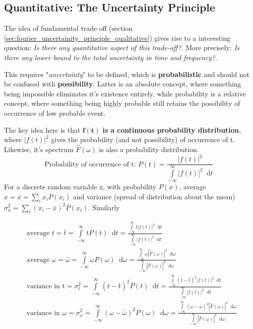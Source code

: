 \documentclass[11pt, a4paper]{article}
\newcommand{\variance}[1]{\sigma_{#1}^{2}}
\newcommand{\diff}{\mathop{}\!\mathrm{d}}
\newcommand{\dt}{\diff t}
\newcommand{\domega}{\diff \omega}
\newcommand{\dint}[2]{\int \limits_{#1}^{#2}}  %
\newcommand{\intinfty}{\dint{-\infty}{\infty}}	%
\begin{document}
\subsection{Quantitative: The Uncertainty Principle}
The idea of fundamental trade off (section \ref{sec:fourier_uncertainity_principle_qualitative}) gives rise to a interesting question: \textit{Is there any quantitative aspect of this trade-off?}. More precisely: \textit{Is there any lower bound to the total uncertainty in time and frequency?}.

This requires "\textit{uncertainty}" to be defined, which is \textbf{probabilistic} and should not be confused with \textbf{possibility}. Latter is an absolute concept, where something being impossible eliminates it's existence entirely, while probability is a relative concept, where something being highly probable still retains the possibility of occurrence of low probable event.

The key idea here is that $\boldsymbol{f(t)}$ \textbf{is a continuous probability distribution}, where $|f(t)|^{2}$ gives the probability (and not possibility) of occurrence of t. Likewise, it's spectrum $\hat{F}(\omega)$ is also a probability distribution.
\begin{equation*}
	\text{Probability of occurrence of t: }P(t) = \frac{|f(t)|^{2}}{\intinfty |f(t)|^{2} \dt}
\end{equation*}
For a discrete random variable x, with probability $P(x)$, average $x = \bar{x} = \sum \limits_{i} x_{i} P(x_{i})$ and variance (spread of distribution about the mean) $ \variance{x} = \sum \limits_{i} (x_{i} - \bar{x})^{2} P(x_{i})$. Similarly

\begin{subequations}
	\begin{align}
		& \text{average } t = \bar{t} = \intinfty t P(t) \dt = \frac{\intinfty t |f(t)|^{2} \dt}{\intinfty |f(t)|^{2} \dt} \label{eq:avg_t} \\
		& \text{average } \omega = \bar{\omega} = \intinfty \omega P(\omega) \domega = \frac{\intinfty \omega |\hat{F}(\omega)|^{2} \domega}{\intinfty |\hat{F}(\omega)|^{2} \domega} \label{eq:avg_omega} \\
		& \text{variance in t} = \variance{t} = \intinfty (t - \bar{t})^{2} P(t) \dt = \frac{\intinfty (t - \bar{t})^{2} |f(t)|^{2} \dt}{\intinfty |f(t)|^{2} \dt} \label{eq:variance_t} \\
		& \text{variance in $\omega$} = \variance{\omega} = \intinfty (\omega - \bar{\omega})^{2} P(\omega) \domega = \frac{\intinfty (\omega - \bar{\omega})^{2} |\hat{F}(\omega)|^{2} \domega}{\intinfty |\hat{F}(\omega)|^{2} \domega} \label{eq:variance_omega}
	\end{align}
\end{subequations}
\end{document}
